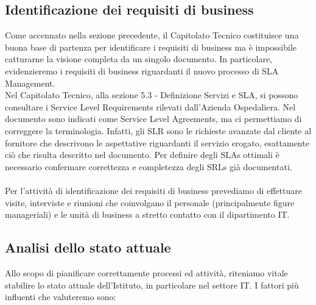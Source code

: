 \subsection{Identificazione dei requisiti di business}

Come accennato nella sezione precedente, il Capitolato Tecnico costituisce una buona base di partenza per identificare i requisiti di business ma è impossibile catturarne la visione completa da un singolo documento. In particolare, evidenzieremo i requisiti di business riguardanti il nuovo processo di SLA Management.
\\
Nel Capitolato Tecnico, alla sezione 5.3 - Definizione Servizi e SLA, si possono consultare i Service Level Requirements rilevati dall'Azienda Ospedaliera. Nel documento sono indicati come Service Level Agreements, ma ci permettiamo di correggere la terminologia. Infatti, gli SLR sono le richieste avanzate dal cliente al fornitore che descrivono le aspettative riguardanti il servizio erogato, esattamente ciò che risulta descritto nel documento. Per definire degli SLAs ottimali è necessario confermare correttezza e completezza degli SRLs già documentati.
\\ \\
Per l'attività di identificazione dei requisiti di business prevediamo di effettuare visite, interviste e riunioni che coinvolgano il personale (principalmente figure manageriali) e le unità di business a stretto contatto con il dipartimento IT.

\subsection{Analisi dello stato attuale}

Allo scopo di pianificare correttamente processi ed attività, riteniamo vitale stabilire lo stato attuale dell'Istituto, in particolare nel settore IT. I fattori più influenti che valuteremo sono:

